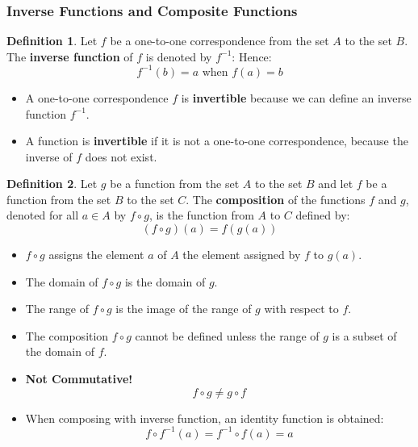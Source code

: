 \documentclass[article, 11pt]{article}
\theoremstyle{definition}
\newtheorem{definition}{Definition}[subsubsection]
\newcommand{\comp}{\circ} %
\begin{document}
    \subsubsection{Inverse Functions and Composite Functions}
    \begin{definition}
        Let $f$ be a one-to-one correspondence from the set $A$ to the set $B$. The \textbf{inverse function} of $f$ is denoted by $f^{-1}$: Hence: 
        \begin{equation*}
            f^{-1}(b) = a \text{ when } f(a) = b
        \end{equation*}
        \begin{itemize}
            \item A one-to-one correspondence $f$ is \textbf{invertible} because we can define an inverse function $f^{-1}$.
            \item A function is \textbf{invertible} if it is not a one-to-one correspondence, because the inverse of $f$ does not exist.
        \end{itemize}
    \end{definition}
    \begin{definition}
        Let $g$ be a function from the set $A$ to the set $B$ and let $f$ be a function from the set $B$ to the set $C$. The \textbf{composition} of the functions $f$ and $g$, denoted for all $a \in A$ by $f \comp g$, is the function from $A$ to $C$ defined by:
        \begin{equation*}
            (f \comp g)(a) = f(g(a))
        \end{equation*}
        \begin{itemize}
            \item $f \comp g$ assigns the element $a$ of $A$ the element assigned by $f$ to $g(a)$. 
            \item The domain of $f \comp g$ is the domain of $g$.
            \item The range of $f \comp g$ is the image of the range of $g$ with respect to $f$.
            \item The composition $f \comp g$ cannot be defined unless the range of $g$ is a subset of the domain of $f$. 
            \item \textbf{Not Commutative!} 
            \begin{equation*}
                f \comp g \neq g \comp f
            \end{equation*}
            \item When composing with inverse function, an identity function is obtained:
            \begin{equation*}
                f \comp f^{-1}(a) = f^{-1} \comp f(a) = a
            \end{equation*}
        \end{itemize}
    \end{definition}
\end{document}
